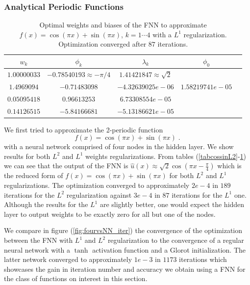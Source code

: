 \documentclass[11pt]{article}
\begin{document}
\subsubsection{Analytical Periodic Functions}
 \begin{table}[!h]
  \begin{center}
\begin{tabular}{ |c|c|c|c|c| } 
\hline
$w_k$ & $\phi_k$ & $\lambda_k$& $\phi_0$ \\
\hline
$1.00000033$ & $-0.78540193 \approx -\pi/4$ &$1.41421847 \approx \sqrt{2}$& \\ 
$1.4969094$&$-0.71483098$ & $-4.32639025e-06$& $1.58219741e-05$ \\ 
$0.05095418$& $ 0.96613253$ & $6.73308554e-05$& \\ 
$0.14126515$& $-5.84166681 $ & $-5.13186621e-05$& \\ 
\hline
\end{tabular}
\caption{Optimal weights and biases of the FNN to approximate $ f(x) = \cos(\pi x) + \sin(\pi x)$, $k = 1\cdots4$ with a $L^1$ regularization. Optimization converged after $87$ iterations.}\label{tabcossinL1}
\end{center}
\end{table}
We first tried to approximate the 2-periodic function 
 $$
 f(x) = \cos(\pi x) + \sin(\pi x)\;.
 $$
 with a neural network comprised of four nodes in the hidden layer. We show results for both $L^2$ and $L^1$ weights regularizations.
From tables (\ref{tabcossinL2}-\ref{tabcossinL1}) we can see that the output of the FNN is $\hat{u}(x) \approx \sqrt{2}\cos(\pi x - \frac{\pi}{4})$ which is the reduced form of  $f(x)= \cos(\pi x) + \sin(\pi x)$ for both $L^2$ and $L^1$ regularizations. The optimization converged to approximately $2e-4$ in $189$ iterations for the $L^2$ regularization against $3e-4$ in $87$ iterations for the $L^1$ one. Although the results for the $L^1$ are slightly better, one would expect the hidden layer to output weights to be exactly zero for all but one of the nodes.

We compare in figure (\ref{fig:fourvsNN_iter}) the convergence of the optimization between the FNN with $L^1$ and $L^2$ regularization to the convergence of a regular neural network with a $\tanh$ activation function and a Glorot initialization. The latter network converged to approximately $1e-3$ in $1173$ iterations which showcases the gain in iteration number and accuracy we obtain using a FNN for the class of functions on interest in this section.
\end{document}
